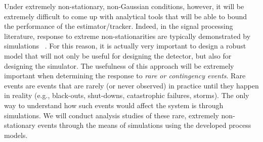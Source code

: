 Under extremely non-stationary, non-Gaussian conditions, however, it will be extremely difficult to come up with analytical tools that will be able to bound the performance of the estimator/tracker. Indeed, in the signal processing literature, response to extreme non-stationarities are typically demonstrated by simulations ~\cite{Yang95,Tanaka05}. For this reason, it is actually
very important to design a robust model that will not only be useful
for designing the detector, but also for designing the simulator.
The usefulness of this approach will be extremely important when
determining the response to {\em rare or contingency events}. Rare events are
events that are rarely (or never observed) in practice until they
happen in reality (e.g., black-outs, shut-downs, catastrophic
failures, storms). The only way to understand how such events would affect
the system is through simulations. We will conduct analysis studies
of these rare, extremely non-stationary events through the means of
simulations using the developed process models.
